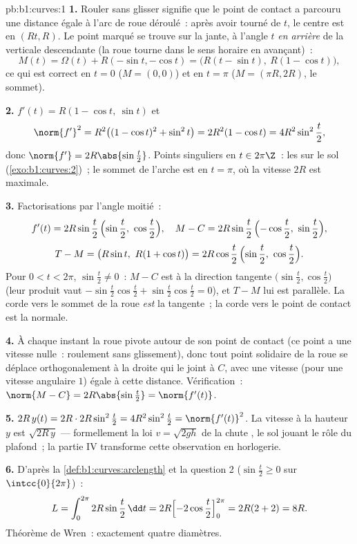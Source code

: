 \begin{solution}{pb:b1:curves:1}
\textbf{1.} Rouler sans glisser signifie que le point de contact a
parcouru une distance égale à l'arc de roue déroulé~: après
avoir tourné de $t$, le centre est en $(Rt, R)$. Le point marqué se trouve
sur la jante, à l'angle $t$ \emph{en arrière} de la verticale descendante
(la roue tourne dans le sens horaire en avançant)~:
\[
M(t) = \Omega(t) + R(-\sin t, -\cos t)
= \bigl(R(t - \sin t),\ R(1 - \cos t)\bigr),
\]
ce qui est correct en $t = 0$ ($M = (0,0)$) et en $t = \pi$ ($M =
(\pi R, 2R)$, le sommet).

\textbf{2.} $f'(t) = R(1 - \cos t,\ \sin t)$ et
\[
\norm{f'}^2 = R^2\bigl((1-\cos t)^2 + \sin^2 t\bigr)
= 2R^2(1 - \cos t) = 4R^2\sin^2\frac t2 ,
\]
donc $\norm{f'} = 2R\abs{\sin\frac t2}$. Points singuliers en $t \in
2\pi\Z$~: les  sur le sol (\cref{exo:b1:curves:2})~; le
sommet de l'arche est en $t = \pi$, où la vitesse $2R$ est maximale.

\textbf{3.} Factorisations par l'angle moitié~:
\[
f'(t) = 2R\sin\frac t2\,\Bigl(\sin\frac t2,\ \cos\frac t2\Bigr),
\quad
M - C = 2R\sin\frac t2\,\Bigl(-\cos\frac t2,\ \sin\frac t2\Bigr),
\]
\[
T - M = \bigl(R\sin t,\ R(1 + \cos t)\bigr)
= 2R\cos\frac t2\,\Bigl(\sin\frac t2,\ \cos\frac t2\Bigr).
\]
Pour $0 < t < 2\pi$, $\sin\frac t2 \neq 0$~: $M - C$ est 
à la direction tangente $\bigl(\sin\frac t2, \cos\frac
t2\bigr)$ (leur produit vaut $-\sin\frac t2\cos\frac t2 +
\sin\frac t2\cos\frac t2 = 0$), et $T - M$ lui est parallèle.
La corde vers le sommet de la roue \emph{est} la tangente~; la
corde vers le point de contact est la normale.

\textbf{4.} À chaque instant la roue pivote autour de son point de
contact (ce point a une vitesse nulle~: roulement sans glissement),
donc tout point solidaire de la roue se déplace orthogonalement à la droite
qui le joint à $C$, avec une vitesse (pour une vitesse angulaire $1$) égale à
cette distance. Vérification~: $\norm{M - C} = 2R\abs{\sin\frac t2} =
\norm{f'(t)}$.

\textbf{5.} $2R\,y(t) = 2R\cdot 2R\sin^2\frac t2 =
4R^2\sin^2\frac t2 = \norm{f'(t)}^2$. La vitesse à la hauteur $y$ est
$\sqrt{2R\,y}$ --- formellement la loi $v = \sqrt{2gh}$ de la chute
, le sol jouant le rôle du plafond~; la partie IV transforme cette
observation en horlogerie.

\textbf{6.} D'après la \cref{def:b1:curves:arclength} et la question 2
($\sin\frac t2 \geq 0$ sur $\intcc{0}{2\pi}$)~:
\[
L = \int_0^{2\pi} 2R\sin\frac t2\,\dd t
= 2R\Bigl[-2\cos\frac t2\Bigr]_0^{2\pi} = 2R(2 + 2) = 8R .
\]
Théorème de Wren~: exactement quatre diamètres.


\end{solution}
